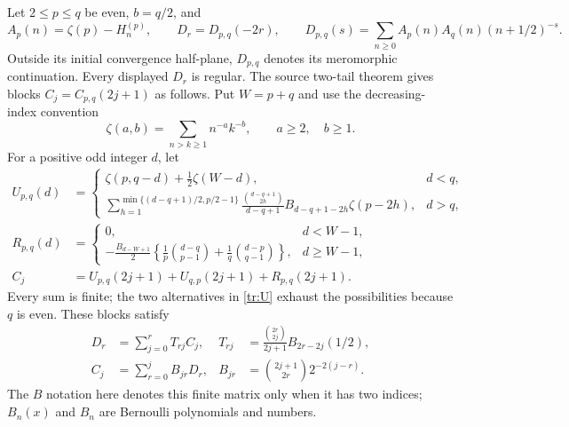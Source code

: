 \documentclass[11pt,a4paper]{article}
\numberwithin{equation}{section}
\theoremstyle{definition}
\begin{document}
Let $2\le p\le q$ be even, $b=q/2$, and
\[
 A_p(n)=\zeta(p)-H_n^{(p)},\qquad
 D_r=D_{p,q}(-2r),\qquad
 D_{p,q}(s)=\sum_{n\ge0}A_p(n)A_q(n)(n+1/2)^{-s}.
\]
Outside its initial convergence half-plane, $D_{p,q}$ denotes its
meromorphic continuation. Every displayed $D_r$ is regular. The source
two-tail theorem gives blocks $C_j=C_{p,q}(2j+1)$ as follows. Put $W=p+q$
and use the decreasing-index convention
\[
 \zeta(a,b)=\sum_{n>k\ge1}n^{-a}k^{-b},\qquad a\ge2,\quad b\ge1.
\]
For a positive odd integer $d$, let
\begin{align}
 U_{p,q}(d)&=
 \begin{cases}
 \zeta(p,q-d)+\frac12\zeta(W-d),&d<q,\\[4pt]
 \displaystyle\sum_{h=1}^{\min\{(d-q+1)/2,p/2-1\}}
 \frac{\binom{d-q+1}{2h}}{d-q+1}B_{d-q+1-2h}\zeta(p-2h),&d>q,
 \end{cases}\label{tr:U}\\
 R_{p,q}(d)&=
 \begin{cases}
 0,&d<W-1,\\[3pt]
 \displaystyle-\frac{B_{d-W+1}}2
 \left\{\frac1p\binom{d-q}{p-1}+\frac1q\binom{d-p}{q-1}\right\},
 &d\ge W-1,
 \end{cases}\label{tr:R}\\
 C_j&=U_{p,q}(2j+1)+U_{q,p}(2j+1)+R_{p,q}(2j+1).
 \label{tr:Cdefinition}
\end{align}
Every sum is finite; the two alternatives in \eqref{tr:U} exhaust the
possibilities because $q$ is even. These blocks satisfy
\begin{align}
 D_r&=\sum_{j=0}^r T_{rj}C_j,
 &T_{rj}&=\frac{\binom{2r}{2j}}{2j+1}B_{2r-2j}(1/2),
 \label{tr:forward}\\
 C_j&=\sum_{r=0}^j B_{jr}D_r,
 &B_{jr}&=\binom{2j+1}{2r}2^{-2(j-r)}.
 \label{tr:backward}
\end{align}
The $B$ notation here denotes this finite matrix only when it has two
indices; $B_n(x)$ and $B_n$ are Bernoulli polynomials and numbers.
\end{document}
